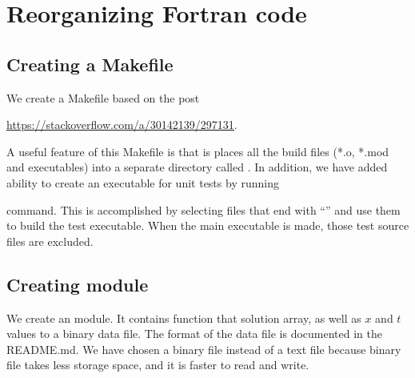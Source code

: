 \section{Reorganizing Fortran code}


\subsection{Creating a Makefile}

We create a Makefile based on the post

\url{https://stackoverflow.com/a/30142139/297131}.

A useful feature of this Makefile is that is places all the build files (*.o, *.mod and executables) into a separate directory called . In addition, we have added ability to create an executable for unit tests by running


command. This is accomplished by selecting files that end with ``'' and use them to build the test executable. When the main executable is made, those test source files are excluded.


\subsection{Creating  module}

We create an  module. It contains  function that solution array, as well as $x$ and $t$ values to a binary data file. The format of the data file is documented in the README.md. We have chosen a binary file instead of a text file because binary file takes less storage space, and it is faster to read and write.



